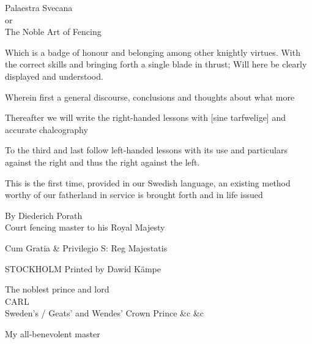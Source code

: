 \cleartoleftpage


\newpage

Palaestra Svecana \\
or \\
The Noble Art of Fencing

Which is a badge of honour and belonging among other knightly
virtues. With the correct skills and bringing forth a single blade in
thrust; Will here be clearly displayed and understood.

Wherein first a general discourse, conclusions and thoughts about what
more 

Thereafter we will write the right-handed lessons with [sine
tarfwelige] and accurate chalcography

To the third and last follow left-handed lessons with its use and
particulars against the right and thus the right against the left.


This is the first time, provided in our Swedish language, an existing
method worthy of our fatherland in service is brought forth and in
life issued

By Diederich Porath \\
Court fencing master to his Royal Majesty

Cum Gratia \& Privilegio S: Reg Majestatis

STOCKHOLM Printed by Dawid Kämpe

\newpage 


\newpage

The noblest prince and lord \\
CARL \\
Sweden's / Geats' and Wendes' Crown Prince \&c \&c

My all-benevolent master
